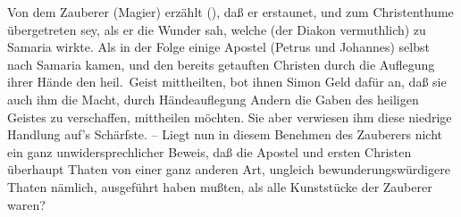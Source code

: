\begin{aufza}
\item Von dem Zauberer (Magier)  erzählt  (), daß er erstaunet, und zum Christenthume übergetreten sey, als er die Wunder sah, welche  (der Diakon vermuthlich) zu Samaria wirkte. Als in der Folge einige Apostel (Petrus und Johannes) selbst nach Samaria kamen, und den bereits getauften Christen durch die Auflegung ihrer Hände den heil.\ Geist mittheilten, bot ihnen Simon Geld dafür an, daß sie auch ihm die Macht, durch Händeauflegung Andern die Gaben des heiligen Geistes zu verschaffen, mittheilen möchten. Sie aber verwiesen ihm diese niedrige Handlung auf's Schärfste. -- Liegt nun in diesem Benehmen  des Zauberers nicht ein ganz unwidersprechlicher Beweis, daß die Apostel und ersten Christen überhaupt Thaten von einer ganz anderen Art, ungleich bewunderungswürdigere Thaten nämlich, ausgeführt haben mußten, als alle Kunststücke der Zauberer waren?

\end{aufza}
